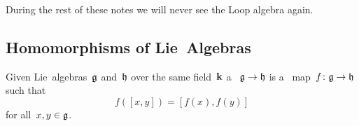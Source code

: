 \begin{remark}
  During the rest of these notes we will never see the Loop algebra again.
\end{remark}





\subsection{Homomorphisms of Lie~Algebras}


\begin{definition}
 Given Lie~algebras~$\mathfrak{g}$ and~$\mathfrak{h}$ over the same field~$\kf$ a ~$\mathfrak{g} \to \mathfrak{h}$ is a~{\linear{$\kf$}} map~$f \colon \mathfrak{g} \to \mathfrak{h}$ such that
 \[
  f([x,y])
  =
  [f(x),f(y)]
 \]
 for all~$x, y \in \mathfrak{g}$.
\end{definition}


